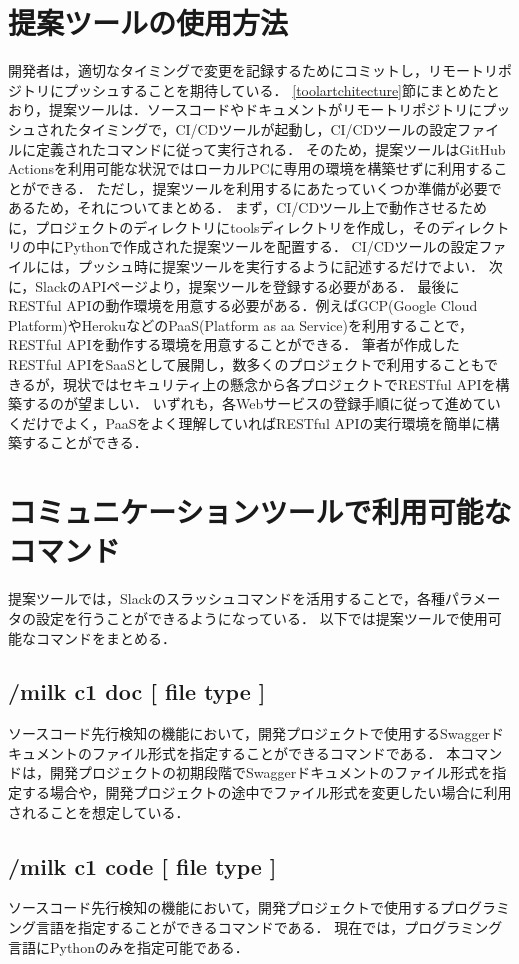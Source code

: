 \section{提案ツールの使用方法}
開発者は，適切なタイミングで変更を記録するためにコミットし，リモートリポジトリにプッシュすることを期待している．
\ref{toolartchitecture}節にまとめたとおり，提案ツールは．ソースコードやドキュメントがリモートリポジトリにプッシュされたタイミングで，CI/CDツールが起動し，CI/CDツールの設定ファイルに定義されたコマンドに従って実行される．
そのため，提案ツールはGitHub Actionsを利用可能な状況ではローカルPCに専用の環境を構築せずに利用することができる．
ただし，提案ツールを利用するにあたっていくつか準備が必要であるため，それについてまとめる．
まず，CI/CDツール上で動作させるために，プロジェクトのディレクトリにtoolsディレクトリを作成し，そのディレクトリの中にPythonで作成された提案ツールを配置する．
CI/CDツールの設定ファイルには，プッシュ時に提案ツールを実行するように記述するだけでよい．
次に，SlackのAPIページより，提案ツールを登録する必要がある．
最後にRESTful APIの動作環境を用意する必要がある．例えばGCP(Google Cloud Platform)\cite{gcp}やHeroku\cite{heroku}などのPaaS(Platform as aa Service)を利用することで，RESTful APIを動作する環境を用意することができる．
筆者が作成したRESTful APIをSaaSとして展開し，数多くのプロジェクトで利用することもできるが，現状ではセキュリティ上の懸念から各プロジェクトでRESTful APIを構築するのが望ましい．
いずれも，各Webサービスの登録手順に従って進めていくだけでよく，PaaSをよく理解していればRESTful APIの実行環境を簡単に構築することができる．

\section{コミュニケーションツールで利用可能なコマンド}
提案ツールでは，Slackのスラッシュコマンドを活用することで，各種パラメータの設定を行うことができるようになっている．
以下では提案ツールで使用可能なコマンドをまとめる．

\subsection*{/milk c1 doc [ file type ]}
ソースコード先行検知の機能において，開発プロジェクトで使用するSwaggerドキュメントのファイル形式を指定することができるコマンドである．
本コマンドは，開発プロジェクトの初期段階でSwaggerドキュメントのファイル形式を指定する場合や，開発プロジェクトの途中でファイル形式を変更したい場合に利用されることを想定している．

\subsection*{/milk c1 code [ file type ]}
ソースコード先行検知の機能において，開発プロジェクトで使用するプログラミング言語を指定することができるコマンドである．
現在では，プログラミング言語にPythonのみを指定可能である．

